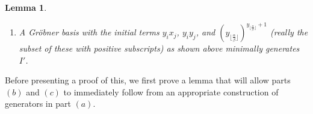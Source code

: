 \documentclass{amsart}
\theoremstyle{plain}
\newtheorem{lem}[thm]{Lemma}
\theoremstyle{definition}
\theoremstyle{remark}
\numberwithin{equation}{section}
\newcommand \initial{\text{in}}
\newcommand \gin{\text{gin}}
\begin{document}
\begin{lem}
\begin{enumerate}
\begin{align*}
	\initial_\prec(I) &= \initial_\prec(I') k[u, x_1, \ldots, x_m, y_1, \ldots, y_n] \\
										 &+ \langle y_i x_j: 1 \le i \le n, 1 \le j \le m \rangle \\
										 &+ \langle y_i y_j: \lfloor \frac{\alpha}{\beta} \rfloor \rangle \le i \le j \le n- 1 \\
										 &+ \langle y_i y_j: 1\le i\le j\lfloor \frac{\alpha}{\beta} \rfloor\\
										 &+ \langle (y_i)^{\deg(y_{i + 1} + 1)}: 1\le i =\lfloor \frac{\alpha}{\beta} \rfloor
\end{align*}

In particular, if $\frac{\alpha}{\beta}\le 1$, then $I$ is minimally generated by elements with leading terms of the form $y_i x_j$ and $y_i y_j$.
\item[(c)] A Gr\"{o}bner basis with the initial terms $y_i x_j$, $y_i y_j$,
	and $(y_{\lfloor \frac{\alpha}{\beta} \rfloor})^{y_{\lfloor
	\frac{\alpha}{\beta} \rfloor} + 1}$ (really the subset of these with positive subscripts) as shown above minimally
generates $I'$.
\end{enumerate}
\end{lem}

Before presenting a proof of this, we first prove a lemma that will allow parts $(b)$ and $(c)$ to immediately follow from an appropriate construction of generators in part $(a)$.
\end{document}
